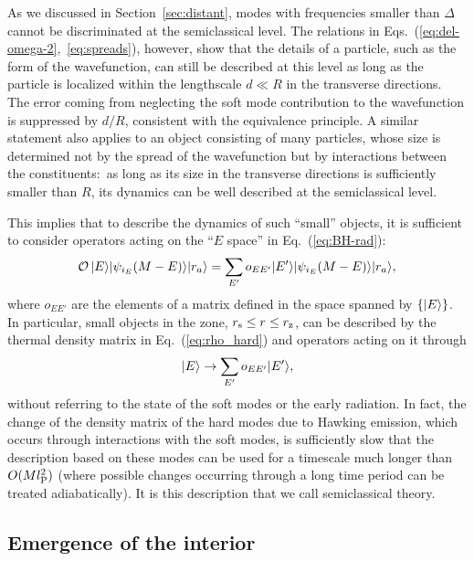 \documentclass[12pt]{article}
\begin{document}
As we discussed in Section~\ref{sec:distant}, modes 
with frequencies smaller than $\Delta$ cannot be 
discriminated at the semiclassical level.  The relations 
in Eqs.~(\ref{eq:del-omega-2},~\ref{eq:spreads}), however, 
show that the details of a particle, such as the form of the 
wavefunction, can still be described at this level as long as 
the particle is localized within the lengthscale $d \ll R$ in 
the transverse directions.  The error coming from neglecting the 
soft mode contribution to the wavefunction is suppressed by $d/R$, 
consistent with the equivalence principle.  A similar statement 
also applies to an object consisting of many particles, whose 
size is determined not by the spread of the wavefunction but by 
interactions between the constituents:\ as long as its size in 
the transverse directions is sufficiently smaller than $R$, its 
dynamics can be well described at the semiclassical level.

This implies that to describe the dynamics of such ``small'' 
objects, it is sufficient to consider operators acting on the 
``$E$ space'' in Eq.~(\ref{eq:BH-rad}):
%
\begin{equation}
  {\cal O}\, \ket{E} \ket{\psi_{i_E}(M-E)} \ket{r_a} 
  = \sum_{E'} o_{E E'} \ket{E'} \ket{\psi_{i_E}(M-E)} \ket{r_a},
\label{eq:semicl-op}
\end{equation}
%
where $o_{E E'}$ are the elements of a matrix defined in the space 
spanned by $\{ | E \rangle \}$.  In particular, small objects in the 
zone, $r_{\rm s} \leq r \leq r_{\rm z}$, can be described by the 
thermal density matrix in Eq.~(\ref{eq:rho_hard}) and operators 
acting on it through
%
\begin{equation}
  \ket{E} \rightarrow \sum_{E'} o_{E E'} \ket{E'},
\label{eq:zone}
\end{equation}
%
without referring to the state of the soft modes or the early 
radiation.  In fact, the change of the density matrix of the hard 
modes due to Hawking emission, which occurs through interactions 
with the soft modes, is sufficiently slow that the description 
based on these modes can be used for a timescale much longer 
than $O(M l_{\rm P}^2)$ (where possible changes occurring through 
a long time period can be treated adiabatically).  It is this 
description that we call semiclassical theory.


\subsection{Emergence of the interior}
\label{subsec:interior}
\end{document}
